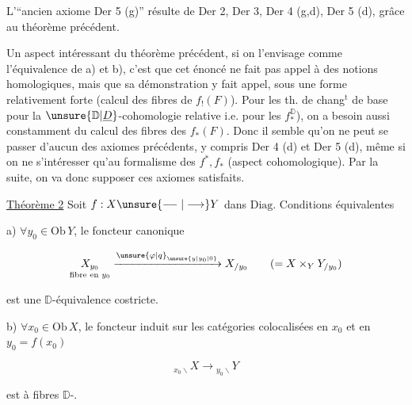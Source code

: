 

L'``ancien axiome Der 5 (g)'' résulte de Der 2, Der 3, Der 4 (g,d), Der 5 (d), grâce au théorème précédent.

Un aspect intéressant du théorème précédent, si on l'envisage comme  l'équivalence de a) et b), c'est que cet énoncé ne fait pas appel à des notions homologiques, mais que sa démonstration y fait appel, sous une forme relativement forte (calcul des fibres de $f_!(F)$). Pour les th. de chang$^{\mathrm t}$ de base pour la $\unsure{\mathbb D|\underline D}$-cohomologie relative i.e. pour les $f_*^{\mathbb D}$), on a besoin aussi constamment du calcul des fibres des $f_*(F)$. Donc il semble qu'on ne peut se passer d'aucun des axiomes précédents, y compris Der 4 (d) et Der 5 (d), même si on ne  s'intéresser qu'au formalisme des $f^*,f_*$ (aspect cohomologique). Par la suite, on va donc supposer ces axiomes satisfaits.

\uline{Théorème 2} Soit $f:X\unsure{\relbar\joinrel\relbar|\longrightarrow}Y$ dans $\mathrm{Diag}$. Conditions équivalentes

a) $\forall y_0\in\mathrm{Ob}\,Y$, le foncteur canonique 

\[ \underset{\text{fibre en }y_0}{X_{y_0}}\xrightarrow{\unsure{\varphi|q}_{\unsure{y|y_0|0}}}X_{/y_0}\qquad (=X\times_Y Y_{/y_0}) \]

est une $\mathbb D$-équivalence costricte.

b) $\forall x_0\in\mathrm{Ob}\,X$, le foncteur induit sur les catégories colocalisées en $x_0$ et en $y_0=f(x_0)$

\[ {}_{x_0\backslash}X\longrightarrow{}_{y_0\backslash}Y \]

est à fibres $\mathbb D$-.
